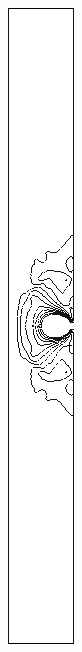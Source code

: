 \begin{figure}[h]
\centering
\begin{subfigure}[b]{0.13\textwidth}
\centering
\includegraphics[width=\textwidth]{png/cranium/2d-sxx-single-comp-01.png}

\end{subfigure}
\end{figure}
